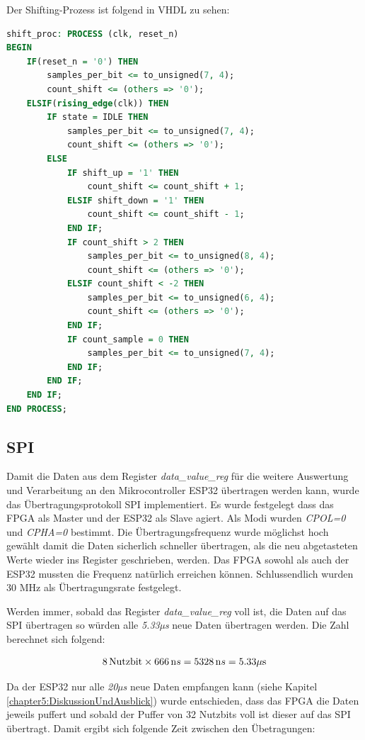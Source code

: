 Der Shifting-Prozess ist folgend in VHDL zu sehen:

\begin{lstlisting}[language=vhdl]
shift_proc: PROCESS (clk, reset_n)
BEGIN		
	IF(reset_n = '0') THEN
		samples_per_bit <= to_unsigned(7, 4);
		count_shift <= (others => '0');
	ELSIF(rising_edge(clk)) THEN
		IF state = IDLE THEN
			samples_per_bit <= to_unsigned(7, 4);
			count_shift <= (others => '0');
		ELSE	
			IF shift_up = '1' THEN
				count_shift <= count_shift + 1;
			ELSIF shift_down = '1' THEN
				count_shift <= count_shift - 1;
			END IF;
			IF count_shift > 2 THEN
				samples_per_bit <= to_unsigned(8, 4);
				count_shift <= (others => '0');
			ELSIF count_shift < -2 THEN
				samples_per_bit <= to_unsigned(6, 4);
				count_shift <= (others => '0');
			END IF;
			IF count_sample = 0 THEN
				samples_per_bit <= to_unsigned(7, 4);
			END IF;	
		END IF;
	END IF;
END PROCESS;
\end{lstlisting}



\subsection{SPI}
\label{fpga:spi}
Damit die Daten aus dem Register \textit{data\_value\_reg} für die weitere Auswertung und Verarbeitung an den Mikrocontroller ESP32 übertragen werden kann, wurde das Übertragungsprotokoll SPI implementiert. Es wurde festgelegt dass das FPGA als Master und der ESP32 als Slave agiert. Als Modi wurden \textit{CPOL=0} und \textit{CPHA=0} bestimmt. Die Übertragungsfrequenz wurde möglichst hoch gewählt damit die Daten sicherlich schneller übertragen, als die neu abgetasteten Werte wieder ins Register geschrieben, werden.
Das FPGA sowohl als auch der ESP32 mussten die Frequenz natürlich erreichen können. Schlussendlich wurden 30 MHz als Übertragungsrate festgelegt.

Werden immer, sobald das Register \textit{data\_value\_reg} voll ist, die Daten auf das SPI übertragen so würden alle \textit{5.33µs} neue Daten übertragen werden. Die Zahl berechnet sich folgend:

\begin{equation}
    8 \, \text{Nutzbit} \times 666 \, \text ns = 5328 \, \text ns = 5.33 \mu\text s \label{eq:calc_nutzbit1}
\end{equation}

Da der ESP32 nur alle \textit{20µs} neue Daten empfangen kann (siehe Kapitel \ref{chapter5:DiskussionUndAusblick}) wurde entschieden, dass das FPGA die Daten jeweils puffert und sobald der Puffer von 32 Nutzbits voll ist dieser auf das SPI übertragt. Damit ergibt sich folgende Zeit zwischen den Übetragungen:

